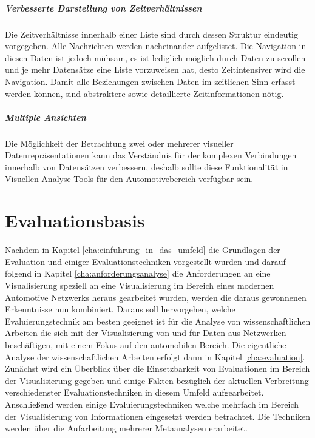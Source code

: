 \documentclass[draft=false
              ,paper=a4
              ,twoside=false
              ,fontsize=11pt
              ,headsepline
              ,BCOR10mm
              ,DIV11
              ]{scrbook}
\begin{document}
\paragraph{Verbesserte Darstellung von Zeitverhältnissen} %
\label{par:verbesserte_darstellung_von_zeitverhältnissen}
Die Zeitverhältnisse innerhalb einer Liste sind durch dessen Struktur eindeutig vorgegeben. Alle Nachrichten werden nacheinander aufgelistet. Die Navigation in diesen Daten ist jedoch mühsam, es ist lediglich möglich durch Daten zu scrollen und je mehr Datensätze eine Liste vorzuweisen hat, desto Zeitintensiver wird die Navigation. Damit alle Beziehungen zwischen Daten im zeitlichen Sinn erfasst werden können, sind abstraktere sowie detaillierte Zeitinformationen nötig.
\paragraph{Multiple Ansichten} %
\label{par:multiple_ansichten}
Die Möglichkeit der Betrachtung zwei oder mehrerer visueller Datenrepräsentationen kann das Verständnis für der komplexen Verbindungen innerhalb von Datensätzen verbessern, deshalb sollte diese Funktionalität in Visuellen Analyse Tools für den Automotivebereich verfügbar sein.

\chapter{Evaluationsbasis} %
\label{cha:evaluationsbasis}
Nachdem in Kapitel \ref{cha:einfuhrung_in_das_umfeld} die Grundlagen der Evaluation und einiger Evaluationstechniken vorgestellt wurden und darauf folgend in Kapitel \ref{cha:anforderungsanalyse} die Anforderungen an eine Visualisierung speziell an eine Visualisierung im Bereich eines modernen Automotive Netzwerks heraus gearbeitet wurden, werden die daraus gewonnenen Erkenntnisse nun kombiniert. Daraus soll hervorgehen, welche Evaluierungstechnik am besten geeignet ist für die Analyse von wissenschaftlichen Arbeiten die sich mit der Visualisierung von und für Daten aus Netzwerken beschäftigen, mit einem Fokus auf den automobilen Bereich. Die eigentliche Analyse der wissenschaftlichen Arbeiten erfolgt dann in Kapitel \ref{cha:evaluation}. Zunächst wird ein Überblick über die Einsetzbarkeit von Evaluationen im Bereich der Visualisierung gegeben und einige Fakten bezüglich der aktuellen Verbreitung verschiedenster Evaluationstechniken in diesem Umfeld aufgearbeitet. Anschließend werden einige Evaluierungstechniken welche mehrfach im Bereich der Visualisierung von Informationen eingesetzt werden betrachtet. Die Techniken werden über die Aufarbeitung mehrerer Metaanalysen erarbeitet.
\end{document}
